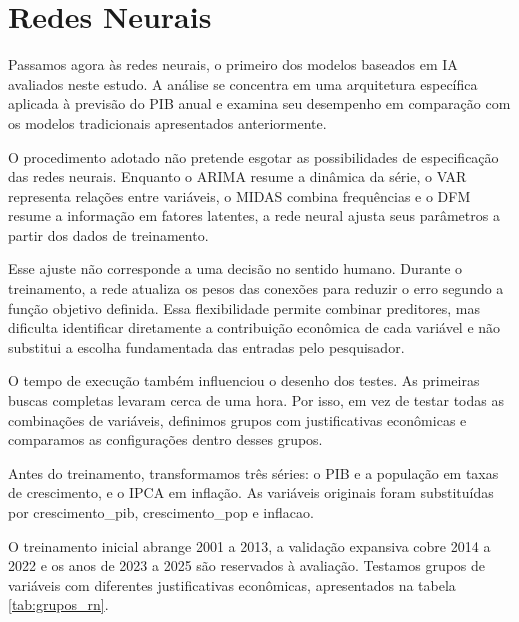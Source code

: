 \section{Redes Neurais}

Passamos agora às redes neurais, o primeiro dos modelos baseados em IA avaliados neste estudo. A análise se concentra em uma arquitetura específica aplicada à previsão do PIB anual e examina seu desempenho em comparação com os modelos tradicionais apresentados anteriormente.

O procedimento adotado não pretende esgotar as possibilidades de especificação das redes neurais. Enquanto o ARIMA resume a dinâmica da série, o VAR representa relações entre variáveis, o MIDAS combina frequências e o DFM resume a informação em fatores latentes, a rede neural ajusta seus parâmetros a partir dos dados de treinamento.

Esse ajuste não corresponde a uma decisão no sentido humano. Durante o treinamento, a rede atualiza os pesos das conexões para reduzir o erro segundo a função objetivo definida. Essa flexibilidade permite combinar preditores, mas dificulta identificar diretamente a contribuição econômica de cada variável e não substitui a escolha fundamentada das entradas pelo pesquisador.

O tempo de execução também influenciou o desenho dos testes. As primeiras buscas completas levaram cerca de uma hora. Por isso, em vez de testar todas as combinações de variáveis, definimos grupos com justificativas econômicas e comparamos as configurações dentro desses grupos.

Antes do treinamento, transformamos três séries: o PIB e a população em taxas de crescimento, e o IPCA em inflação. As variáveis originais foram substituídas por crescimento\_pib, crescimento\_pop e inflacao.

O treinamento inicial abrange 2001 a 2013, a validação expansiva cobre 2014 a 2022 e os anos de 2023 a 2025 são reservados à avaliação. Testamos grupos de variáveis com diferentes justificativas econômicas, apresentados na tabela \ref{tab:grupos_rn}.

